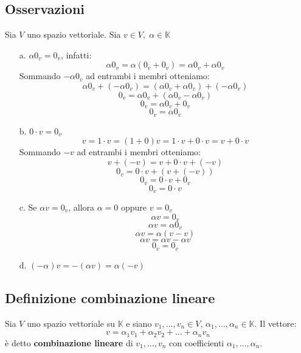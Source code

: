 \documentclass[a4paper]{article}
\theoremstyle{break}
\theoremstyle{break}
\theoremstyle{break}
\theoremstyle{break}
\begin{document}
  \subsection{Osservazioni} \label{oss:5.2}
  Sia \( V \) uno spazio vettoriale. Sia \( v \in V,\; \alpha \in \mathbb{K} \) 
  \begin{enumerate}
    \item[a.] \( \alpha 0_v = 0_v \), infatti:
      \[
      \alpha 0_v = \alpha (0_v + 0_v) = \alpha 0_v + \alpha 0_v
      \] 
      Sommando \( -\alpha 0_v \) ad entrambi i membri otteniamo:
      \[
      \alpha 0_v + (-\alpha 0_v) = (\alpha 0_v + \alpha 0_v) + (-\alpha 0_v)
      \] 
      \[
      0_v = \alpha 0_v + (\alpha 0_v - \alpha 0_v)
      \] 
      \[
      0_v  = \alpha 0_v + 0_v
      \] 
      \[
      0_v = \alpha 0_v
      \] 
    \item[b.] \( 0 \cdot v = 0_v \) 
      \[
      v = 1 \cdot v = (1+0)v = 1 \cdot v + 0 \cdot v = v + 0 \cdot v
      \] 
      Sommando \( -v \) ad entrambi i membri otteniamo:
      \[
      v + (-v) = v + 0 \cdot v + (-v)
      \] 
      \[
      0_v = 0 \cdot v + (v + (-v))
      \] 
      \[
      0_v = 0 \cdot v + 0_v
      \] 
      \[
      0_v = 0 \cdot v
      \] 

    \item[c.] Se \( \alpha v = 0_v \), allora \( \alpha = 0 \) oppure \( v = 0_v \) 
      \[
      \alpha v = 0_v
      \] 
      \[
      \alpha v = \alpha 0_v
      \] 
      \[
      \alpha v = \alpha (v - v)
      \] 
      \[
      \alpha v = \alpha v - \alpha v
      \] 
      \[
      0_v = 0_v
      \]

    \item[d.] \( (-\alpha)v = -(\alpha v) = \alpha (-v) \) 
  \end{enumerate}

  \subsection{Definizione combinazione lineare}
  Sia \( V \) uno spazio vettoriale su \( \mathbb{K} \) e siano \( v_1, \ldots, v_n \in V \),
  \( \alpha_1, \ldots, \alpha_n \in \mathbb{K} \). Il vettore:
  \[
  v = \alpha_1 v_1 + \alpha_2 v_2 + \ldots + \alpha_n v_n
  \] 
  è detto \textbf{combinazione lineare} di \( v_1, \ldots, v_n \) con coefficienti
  \( \alpha_1, \ldots, \alpha_n \).
\end{document}
